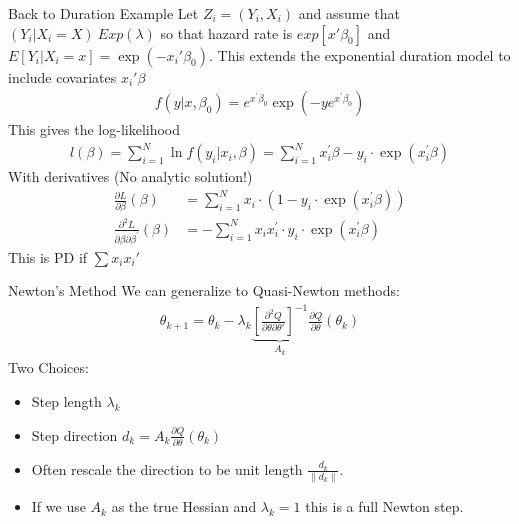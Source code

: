 \documentclass[aspectratio=169]{beamer}
\newcommand{\norm}[1]{\left\lVert#1\right\rVert}
\begin{document}
\begin{frame}{Back to Duration Example}
Let $Z_i = (Y_i,X_i)$ and assume that $(Y_i | X_i = X) ~ Exp(\lambda)$ so that hazard rate is $exp[x'\beta_0]$ and $E[Y_i | X_i=x] = \exp(-x_i'\beta_0)$. This extends the exponential duration model to include covariates $x_i'\beta$
\begin{align*}
f ( y | x , \beta _ { 0 } ) = { e } ^ { x ^ { \prime } \beta _ { 0 } } \exp \left( - y  { e } ^ { x ^ { \prime } \beta _ { 0 } } \right)
\end{align*}
This gives the log-likelihood
\begin{align*}
l ( \beta ) = \sum _ { i = 1 } ^ { N } \ln f \left( y _ { i } | x _ { i } , \beta \right) = \sum _ { i = 1 } ^ { N } x _ { i } ^ { \prime } \beta - y _ { i } \cdot \exp \left( x _ { i } ^ { \prime } \beta \right)
\end{align*}
With derivatives (No analytic solution!)
\begin{align*}
\frac { \partial L } { \partial \beta } ( \beta ) &= \sum _ { i = 1 } ^ { N } x _ { i } \cdot \left( 1 - y _ { i } \cdot \exp \left( x _ { i } ^ { \prime } \beta \right) \right)\\
\frac { \partial ^ { 2 } L } { \partial \beta \partial \beta ^ { \prime } } ( \beta ) &= - \sum _ { i = 1 } ^ { N } x _ { i } x _ { i } ^ { \prime } \cdot y _ { i } \cdot \exp \left( x _ { i } ^ { \prime } \beta \right)
\end{align*}
This is PD if $\sum x_i x_i'$
\end{frame}

\begin{frame}{Newton's Method}
We can generalize to Quasi-Newton methods:
\begin{align*}
\theta_{k+1} = \theta_k -  \lambda_k \underbrace{\left[ \frac{\partial^2 Q}{\partial \theta \partial \theta'} \right]^{-1}}_{A_k} \frac{\partial Q}{\partial \theta}(\theta_k)
\end{align*}
Two Choices:
\begin{itemize}
\item Step length $\lambda_k$
\item Step direction $d_k=A_k \frac{\partial Q}{\partial \theta}(\theta_k)$
\item Often rescale the direction to be unit length $\frac{d_k}{\norm{d_k}}$.
\item If we use $A_k$ as the true Hessian and $\lambda_k=1$ this is a \alert{full Newton step}.
\end{itemize}
\end{frame}
\end{document}
